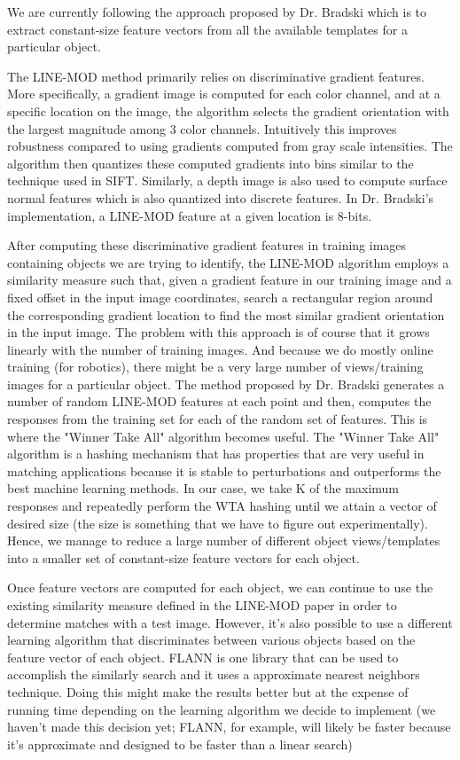 \documentclass[10pt,twocolumn,letterpaper]{article}
\begin{document}
We are currently following the approach proposed by Dr. Bradski which is to extract constant-size feature vectors from all the available templates for a particular object.

The LINE-MOD method primarily relies on discriminative gradient features. More specifically, a gradient image is computed for each color channel, and at a specific location on the image, the algorithm selects the gradient orientation with the largest magnitude among 3 color channels. Intuitively this improves robustness compared to using gradients computed from gray scale intensities. The algorithm then quantizes these computed gradients into bins similar to the technique used in SIFT. Similarly, a depth image is also used to compute surface normal features which is also quantized into discrete features. In Dr. Bradski’s implementation, a LINE-MOD feature at a given location is 8-bits.

After computing these discriminative gradient features in training images containing objects we are trying to identify, the LINE-MOD algorithm employs a similarity measure such that, given a gradient feature in our training image and a fixed offset in the input image coordinates, search a rectangular region around the corresponding gradient location to find the most similar gradient orientation in the input image. The problem with this approach is of course that it grows linearly with the number of training images. And because we do mostly online training (for robotics), there might be a very large number of views/training images for a particular object. The method proposed by Dr. Bradski generates a number of random LINE-MOD features at each point and then, computes the responses from the training set for each of the random set of features. This is where the "Winner Take All" algorithm becomes useful. The "Winner Take All" algorithm is a hashing mechanism that has properties that are very useful in matching applications because it is stable to perturbations and outperforms the best machine learning methods. In our case, we take K of the maximum responses and repeatedly perform the WTA hashing until we attain a vector of desired size (the size is something that we have to figure out experimentally). Hence, we manage to reduce a large number of different object views/templates into a smaller set of constant-size feature vectors for each object.

Once feature vectors are computed for each object, we can continue to use the existing similarity measure defined in the LINE-MOD paper in order to determine matches with a test image. However, it's also possible to use a different learning algorithm that discriminates between various objects based on the feature vector of each object. FLANN is one library that can be used to accomplish the similarly search and it uses a approximate nearest neighbors technique. Doing this might make the results better but at the expense of running time depending on the learning algorithm we decide to implement (we haven't made this decision yet; FLANN, for example, will likely be faster because it's approximate and designed to be faster than a linear search)
\end{document}
